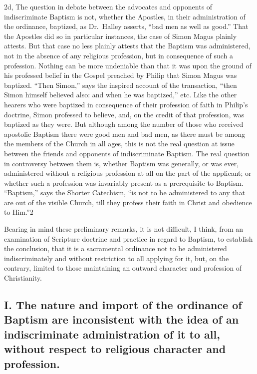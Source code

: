 \documentclass[]{book}
\begin{document}
2d, The question in debate between the advocates and opponents of indiscriminate Baptism is not, whether the Apostles, in their administration of the ordinance, baptized, as Dr.~Halley asserts, ``bad men as well as good.'' That the Apostles did so in particular instances, the case of Simon Magus plainly attests. But that case no less plainly attests that the Baptism was administered, not in the absence of any religious profession, but in consequence of such a profession. Nothing can be more undeniable than that it was upon the ground of his professed belief in the Gospel preached by Philip that Simon Magus was baptized. ``Then Simon,'' says the inspired account of the transaction, ``then Simon himself believed also: and when he was baptized,'' etc. Like the other hearers who were baptized in consequence of their profession of faith in Philip's doctrine, Simon professed to believe, and, on the credit of that profession, was baptized as they were. But although among the number of those who received apostolic Baptism there were good men and bad men, as there must be among the members of the Church in all ages, this is not the real question at issue between the friends and opponents of indiscriminate Baptism. The real question in controversy between them is, whether Baptism was generally, or was ever, administered without a religious profession at all on the part of the applicant; or whether such a profession was invariably present as a prerequisite to Baptism. ``Baptism,'' says the Shorter Catechism, ``is not to be administered to any that are out of the visible Church, till they profess their faith in Christ and obedience to Him.''2

Bearing in mind these preliminary remarks, it is not difficult, I think, from an examination of Scripture doctrine and practice in regard to Baptism, to establish the conclusion, that it is a sacramental ordinance not to be administered indiscriminately and without restriction to all applying for it, but, on the contrary, limited to those maintaining an outward character and profession of Christianity.

\hypertarget{i.-the-nature-and-import-of-the-ordinance-of-baptism-are-inconsistent-with-the-idea-of-an-indiscriminate-administration-of-it-to-all-without-respect-to-religious-character-and-profession.}{%
\subsection{I. The nature and import of the ordinance of Baptism are inconsistent with the idea of an indiscriminate administration of it to all, without respect to religious character and profession.}\label{i.-the-nature-and-import-of-the-ordinance-of-baptism-are-inconsistent-with-the-idea-of-an-indiscriminate-administration-of-it-to-all-without-respect-to-religious-character-and-profession.}}
\end{document}
